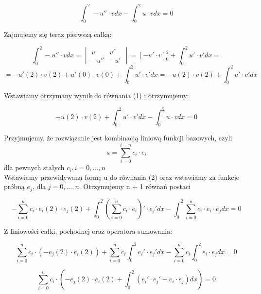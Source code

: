 \documentclass [dvipsnames] {article}
\begin{document}
	\begin {equation}	%
		\int_{0}^{2} -u'' \cdot v dx - \int_{0}^{2}u \cdot vdx = 0
	\end {equation}
	\begin {center}
		Zajmujemy się teraz pierwszą całką:
	\end {center}
	\begin {equation*}
		\int_{0}^{2} -u'' \cdot vdx = 
		\begin {vmatrix}
			v     &     v' \\
			-u''  &    -u'
		\end {vmatrix}
		= [-u' \cdot v]_{0}^{2} + \int_{0}^{2} u' \cdot v'dx =
	\end {equation*}
	\begin {equation*}
		= -u'(2) \cdot v(2) + u'(0) \cdot v(0) + \int_{0}^{2} u' \cdot v'dx =
		-u(2) \cdot v(2) + \int_{0}^{2} u' \cdot v'dx 
	\end {equation*}
	\begin {center}
		Wstawiamy otrzymany wynik do równania (1) i otrzymujemy:
	\end {center}	
	\begin {equation}	%
		-u(2) \cdot v(2) + \int_{0}^{2} u' \cdot v'dx - \int_{0}^{2}u \cdot vdx = 0
	\end {equation}
	
	\begin {center}
		Przyjmujemy, że rozwiązanie jest kombinacją liniową funkcji bazowych, czyli
		 $$u = \sum_{i=0}^{i=n} c_i \cdot e_i $$ dla pewnych stałych $c_i, i = 0,...,n$ \\
		Wstawiamy przewidywaną formę u do równania (2) oraz wstawiamy za funkcje próbną $e_j$, dla $j = 0,...,n$.
		Otrzymujemy n + 1 równań postaci
	\end {center}
	$$-\sum_{i = 0}^{n} c_i \cdot e_i(2) \cdot e_j(2) + \int_{0}^{2} (\sum_{i = 0}^{n} c_i \cdot e_i)' \cdot e_j' dx - \int_{0}^{2}\sum_{i = 0}^{n}c_i \cdot e_i \cdot e_j dx = 0 $$
	\begin {center}
		Z liniowości całki, pochodnej oraz operatora sumowania:
	\end {center}
	$$ \sum_{i = 0}^{n} c_i \cdot (-e_j(2) \cdot e_i(2)) + \sum_{i = 0}^{n} c_i \int_{0}^{2} e_i' \cdot e_j' dx - \sum_{i = 0}^{n} c_i \int_{0}^{2} e_i \cdot e_j dx = 0 $$

	$$ \sum_{i = 0}^{n} c_i \cdot (-e_j(2) \cdot e_i(2) + \int_{0}^{2} (e_i' \cdot e_j' - e_i \cdot e_j) dx) = 0 $$
	
\end{document}
